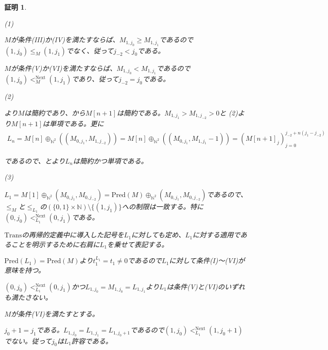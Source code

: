 \documentclass[dvipdfmx,uplatex]{jsarticle}
\theoremstyle{customnonumberbreakfortheorem}
\theoremstyle{customnonumberbreakforproof}
\newtheorem{hideableproof}{証明}
\begin{document}
\begin{hideableproof}
	\begin{indented}
		\item (1)
		\item \(M\)が条件(III)か(IV)を満たすならば、\(M_{1,j_0} \geq M_{1,j_1}\)であるので\((1,j_0) \leq_M (1,j_1)\)でなく、従って\(j_{-2} < j_0\)である。
		\item \(M\)が条件(V)か(VI)を満たすならば、\(M_{1,j_0} < M_{1,j_1}\)であるので\((1,j_0) <_M^{\textrm{Next}} (1,j_1)\)であり、従って\(j_{-2} = j_0\)である。
		\item
		\item (2)
		\item {}より\(M\)は簡約であり、から\(M[n+1]\)は簡約である。\(M_{1,j_1} > M_{1,j_{-2}} > 0\)と (2)より\(M[n+1]\)は単項である。更に
		\begin{eqnarray*}
		L_n = M[n] \oplus_{\mathbb{N}^2} ((M_{0,j_1},M_{1,j_{-2}})) = M[n] \oplus_{\mathbb{N}^2} ((M_{0,j_1},M_{1,j_1}-1)) = (M[n+1]_j)_{j=0}^{j_{-2}+n(j_1-j_{-2})}
		\end{eqnarray*}
		\item であるので、とより\(L_n\)は簡約かつ単項である。
		\item
		\item (3)
		\item \(L_1 = M[1] \oplus_{\mathbb{N}^2} (M_{0,j_1},M_{0,j_{-2}}) = \textrm{Pred}(M) \oplus_{\mathbb{N}^2} (M_{0,j_1},M_{0,j_{-2}})\)であるので、\(\leq_M\)と\(\leq_{L_1}\)の\((\{0,1\} \times \mathbb{N}) \setminus \{(1,j_1)\}\)への制限は一致する。特に\((0,j_0) <_{L_1}^{\textrm{Next}} (0,j_1)\)である。
		\item \(\textrm{Trans}\)の再帰的定義中に導入した記号を\(L_1\)に対しても定め、\(L_1\)に対する適用であることを明示するために右肩に\(L_1\)を乗せて表記する。
		\item \(\textrm{Pred}(L_1) = \textrm{Pred}(M)\)より\(t_1^{L_1} = t_1 \neq 0\)であるので\(L_1\)に対して条件(I)～(VI)が意味を持つ。
		\item \((0,j_0) <_{L_1}^{\textrm{Next}} (0,j_1)\)かつ\(L_{1,j_0} = M_{1,j_0} = L_{1,j_1}\)より\(L_1\)は条件(V)と(VI)のいずれも満たさない。
		\item \(M\)が条件(VI)を満たすとする。
		\begin{indented}
			\item \(j_0+1 = j_1\)である。\(L_{1,j_0} = L_{1,j_1} = L_{1,j_0+1}\)であるので\((1,j_0) <_{L_1}^{\textrm{Next}} (1,j_0+1)\)でない。従って\(j_0\)は\(L_1\)許容である。

\end{indented}
\end{indented}
\end{hideableproof}
\end{document}
